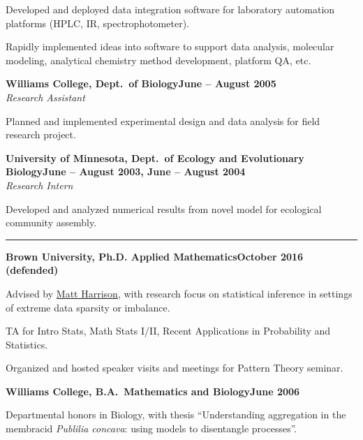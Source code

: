 \documentclass{article}
\newcommand{\ressection}[1]{\noindent{\large\textbf{#1}}\vspace{2pt}\hrule\vspace{4pt}}
\newcommand{\leftandright}[2]{\noindent\textbf{#1}\hfill\textbf{#2}}
\begin{document}
\begin{itemize*}
\item Developed and deployed data integration software for laboratory
  automation platforms (HPLC, IR, spectrophotometer).
\item Rapidly implemented ideas into software to support data
  analysis, molecular modeling, analytical chemistry method
  development, platform QA, etc.
\end{itemize*}

\leftandright{Williams College, Dept.\ of Biology}{June -- August 2005} \\
\textit{Research Assistant}

\begin{itemize*}
\item Planned and implemented experimental design and data analysis
  for field research project.
\end{itemize*}

\leftandright{University of Minnesota, Dept.\ of Ecology and
  Evolutionary Biology}{June -- August 2003, June -- August 2004} \\
\textit{Research Intern}

\begin{itemize*}
\item Developed and analyzed numerical results from novel model for ecological
  community assembly.
\end{itemize*}

\ressection{Education}

\leftandright{Brown University, \textmd{Ph.D. Applied
    Mathematics}}{October 2016 (defended)}
\begin{itemize*}
\item Advised by \href{http://www.dam.brown.edu/people/harrison}{Matt
    Harrison}, with research focus on statistical inference in
  settings of extreme data sparsity or imbalance.
\item TA for Intro Stats, Math Stats I/II, Recent Applications in
  Probability and Statistics.
\item Organized and hosted speaker visits and meetings for Pattern
  Theory seminar.
\end{itemize*}

\leftandright{Williams College, \textmd{B.A.\ Mathematics and
    Biology}}{June 2006}
\begin{itemize*}
\item Departmental honors in Biology, with thesis ``Understanding
  aggregation in the membracid \emph{Publilia concava}: using models
  to disentangle processes''.
\end{itemize*}
\end{document}
